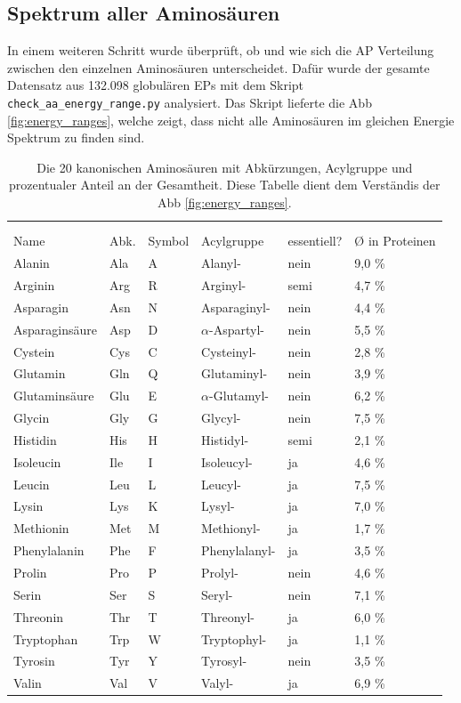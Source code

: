 \subsection{Spektrum aller Aminosäuren}
In einem weiteren Schritt wurde überprüft, ob und wie sich die \ac{AP} Verteilung zwischen den einzelnen Aminosäuren unterscheidet. Dafür wurde der gesamte Datensatz aus 132.098 globulären \ac{EPs} mit dem Skript \texttt{check\_aa\_energy\_range.py} analysiert. Das Skript lieferte die \ac{Abb} \ref{fig:energy_ranges}, welche zeigt, dass nicht alle Aminosäuren im gleichen Energie Spektrum zu finden sind. %
\begin{table}[]
\centering
\begin{tabular}{llllll}
 &  &  &  &  &  \\
 &  &  &  &  &  \\ \hline
\multicolumn{1}{|l|}{Name} & \multicolumn{1}{l|}{Abk.} & \multicolumn{1}{l|}{Symbol} & \multicolumn{1}{l|}{Acylgruppe} & \multicolumn{1}{l|}{essentiell?} & \multicolumn{1}{l|}{Ø in Proteinen} \\ \hline
Alanin & Ala & A & Alanyl- & nein & 9,0 \% \\
Arginin & Arg & R & Arginyl- & semi & 4,7 \% \\
Asparagin & Asn & N & Asparaginyl- & nein & 4,4 \% \\
Asparaginsäure & Asp & D & $\alpha$-Aspartyl- & nein & 5,5 \% \\
Cystein & Cys & C & Cysteinyl- & nein & 2,8 \% \\
Glutamin & Gln & Q & Glutaminyl- & nein & 3,9 \% \\
Glutaminsäure & Glu & E & $\alpha$-Glutamyl- & nein & 6,2 \% \\
Glycin & Gly & G & Glycyl- & nein & 7,5 \% \\
Histidin & His & H & Histidyl- & semi & 2,1 \% \\
Isoleucin & Ile & I & Isoleucyl- & ja & 4,6 \% \\
Leucin & Leu & L & Leucyl- & ja & 7,5 \% \\
Lysin & Lys & K & Lysyl- & ja & 7,0 \% \\
Methionin & Met & M & Methionyl- & ja & 1,7 \% \\
Phenylalanin & Phe & F & Phenylalanyl- & ja & 3,5 \% \\
Prolin & Pro & P & Prolyl- & nein & 4,6 \% \\
Serin & Ser & S & Seryl- & nein & 7,1 \% \\
Threonin & Thr & T & Threonyl- & ja & 6,0 \% \\
Tryptophan & Trp & W & Tryptophyl- & ja & 1,1 \% \\
Tyrosin & Tyr & Y & Tyrosyl- & nein & 3,5 \% \\
Valin & Val & V & Valyl- & ja & 6,9 \%
\end{tabular}
\caption{Die 20 kanonischen Aminosäuren mit Abkürzungen, Acylgruppe und prozentualer Anteil an der Gesamtheit\protect\footnotemark. Diese Tabelle dient dem Verständis der \ac{Abb} \ref{fig:energy_ranges}.}
\label{tab:amino_table}
\end{table}

